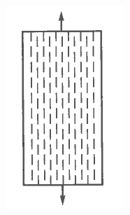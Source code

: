 \begin{figure}[h]
\begin{subfigure}[b]{0.2\textwidth}
\centering
\includegraphics[width=\textwidth]{png/composites-types-2.png}
\caption{ }
\end{subfigure}
\begin{subfigure}[b]{0.2\textwidth}
\centering

\end{subfigure}
\end{figure}
